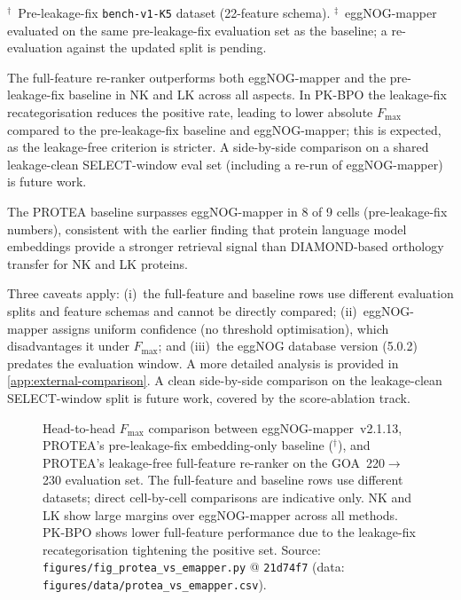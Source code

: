 \noindent$^\dagger$~Pre-leakage-fix \texttt{bench-v1-K5} dataset (22-feature schema).
$^\ddagger$~eggNOG-mapper evaluated on the same pre-leakage-fix evaluation set
as the baseline; a re-evaluation against the updated split is pending.

The full-feature re-ranker outperforms both eggNOG-mapper and the pre-leakage-fix
baseline in NK and LK across all aspects. In PK-BPO the leakage-fix
recategorisation reduces the positive rate, leading to lower absolute
$F_{\max}$ compared to the pre-leakage-fix baseline and eggNOG-mapper;
this is expected, as the leakage-free criterion is stricter. A side-by-side
comparison on a shared leakage-clean SELECT-window eval set (including a re-run
of eggNOG-mapper) is future work.

The PROTEA baseline surpasses eggNOG-mapper in 8 of 9 cells (pre-leakage-fix
numbers), consistent with the earlier finding that protein language model
embeddings provide a stronger retrieval signal than DIAMOND-based orthology
transfer for NK and LK proteins.

Three caveats apply: (i)~the full-feature and baseline rows use different evaluation
splits and feature schemas and cannot be directly compared;
(ii)~eggNOG-mapper assigns uniform confidence (no threshold optimisation),
which disadvantages it under $F_{\max}$; and (iii)~the eggNOG database
version (5.0.2) predates the evaluation window. A more detailed analysis is
provided in \cref{app:external-comparison}. A clean side-by-side comparison
on the leakage-clean SELECT-window split is future work, covered by the
score-ablation track.

\begin{figure}[htbp]
  \centering
  
  \caption[PROTEA vs eggNOG-mapper across NK/LK/PK and aspects]{%
    Head-to-head $F_{\max}$ comparison between eggNOG-mapper~v2.1.13,
    PROTEA's pre-leakage-fix embedding-only baseline ($^\dagger$), and
    PROTEA's leakage-free full-feature re-ranker on the GOA~220$\to$230
    evaluation set. The full-feature and baseline rows use different datasets;
    direct cell-by-cell comparisons are indicative only. NK and LK show large
    margins over eggNOG-mapper across all methods. PK-BPO shows lower full-feature
    performance due to the leakage-fix recategorisation tightening the positive set.
    Source: \texttt{figures/fig\_protea\_vs\_emapper.py} @ \texttt{21d74f7}
    (data: \texttt{figures/data/protea\_vs\_emapper.csv}).%
  }
  \label{fig:protea-vs-emapper}
\end{figure}
